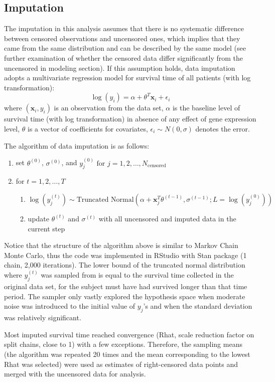 \documentclass[a4paper]{article}
\begin{document}
\subsection{Imputation}
The imputation in this analysis assumes that there is no systematic difference between censored observations and uncensored ones, which implies that they came from the same distribution and can be described by the same model (see further examination of whether the censored data differ significantly from the uncensored in modeling section). If this assumption holds, data imputation adopts a multivariate regression model for survival time of all patients (with log transformation): $$\log(y_{i}) = \alpha + {\theta}^{T}\mathbf{x}_{i} + \epsilon_{i}$$ where $(\mathbf{x}_{i}, y_{i})$ is an observation from the data set, $\alpha$ is the baseline level of survival time (with log transformation) in absence of any effect of gene expression level, ${\theta}$ is a vector of coefficients for covariates, $\epsilon_{i} \sim N(0, \sigma)$ denotes the error.

The algorithm of data imputation is as follows: 
\begin{enumerate}
\item set $\theta^{(0)}$, $\sigma^{(0)}$, and $y_{j}^{(0)} \text{ for }j = 1, 2, \ldots, N_{\text{censored}}$
\item for $t = 1, 2, \ldots, T$
\begin{enumerate}
\item $\log(y_{j}^{(t)}) \sim \textrm{Truncated Normal}(\alpha + \mathbf{x}_{j}^{T}\theta^{(t - 1)}, \sigma^{(t - 1)}; L = \log(y_{j}^{(0)})) \,$
\item update $\theta^{(t)}$ and $\sigma^{(t)}$ with all uncensored and imputed data in the current step
\end{enumerate}
\end{enumerate}

Notice that the structure of the algorithm above is similar to Markov Chain Monte Carlo, thus the code was implemented in RStudio with Stan package (1 chain, 2,000 iterations). The lower bound of the truncated normal distribution where $y_{j}^{(t)}$ was sampled from is equal to the survival time collected in the original data set, for the subject must have had survived longer than that time period. The sampler only vastly explored the hypothesis space when moderate noise was introduced to the initial value of $y_{j}$'s and when the standard deviation was relatively significant.

Most imputed survival time reached convergence (Rhat, scale reduction factor on split chains, close to 1) with a few exceptions. Therefore, the sampling means (the algorithm was repeated 20 times and the mean corresponding to the lowest Rhat was selected) were used as estimates of right-censored data points and merged with the uncensored data for analysis.
\end{document}
